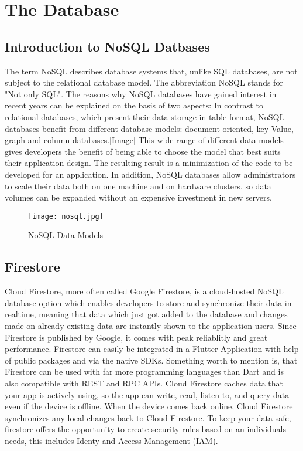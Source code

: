 
\chapter{The Database}

\section{Introduction to NoSQL Datbases}
The term NoSQL describes database systems that, unlike SQL databases, are not subject to the relational database model. The abbreviation NoSQL stands for "Not only SQL". The reasons why NoSQL databases have gained interest in recent years can be explained on the basis of two aspects: In contrast to relational databases, which present their data storage in table format, NoSQL databases benefit from different database models: document-oriented, key Value, graph and column databases.[Image] This wide range of different data models gives developers the benefit of being able to choose the model that best suits their application design. The resulting result is a minimization of the code to be developed for an application. In addition, NoSQL databases allow administrators to scale their data both on one machine and on hardware clusters, so data volumes can be expanded without an expensive investment in new servers.
\begin{figure}
	\centering
	\texttt{[image: nosql.jpg]}
	\caption[NoSQL Data Models]{NoSQL Data Models}
\end{figure}
\section{Firestore}
Cloud Firestore, more often called Google Firestore, is a cloud-hosted NoSQL database option which enables developers to store and synchronize their data in realtime, meaning that data which just got added to the database and changes made on already existing data are instantly shown to the application users. Since Firestore is published by Google, it comes with peak reliablitly and great performance.  Firestore can easily be integrated in a Flutter Application with help of public packages and via the native SDKs. Something worth to mention is, that Firestore can be used with far more programming languages than Dart and is also compatible with REST and RPC APIs. Cloud Firestore caches data that your app is actively using, so the app can write, read, listen to, and query data even if the device is offline. When the device comes back online, Cloud Firestore synchronizes any local changes back to Cloud Firestore. To keep your data safe, firestore offers the opportunity to create security rules based on an individuals needs, this includes Identy and Access Management (IAM).

